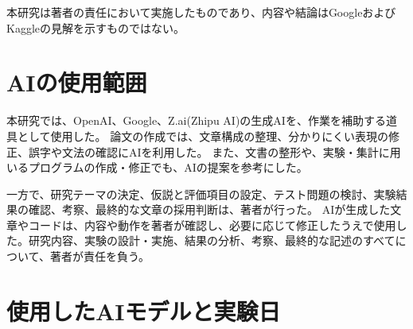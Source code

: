 \documentclass[11pt,a4paper]{ltjsarticle}
\begin{document}
本研究は著者の責任において実施したものであり、内容や結論はGoogleおよびKaggleの見解を示すものではない。
\appendix
\section{AIの使用範囲}

本研究では、OpenAI、Google、Z.ai(Zhipu AI)の生成AIを、作業を補助する道具として使用した。
論文の作成では、文章構成の整理、分かりにくい表現の修正、誤字や文法の確認にAIを利用した。
また、文書の整形や、実験・集計に用いるプログラムの作成・修正でも、AIの提案を参考にした。

一方で、研究テーマの決定、仮説と評価項目の設定、テスト問題の検討、実験結果の確認、考察、最終的な文章の採用判断は、著者が行った。
AIが生成した文章やコードは、内容や動作を著者が確認し、必要に応じて修正したうえで使用した。研究内容、実験の設計・実施、結果の分析、考察、最終的な記述のすべてについて、著者が責任を負う。

\section{使用したAIモデルと実験日}
\end{document}
